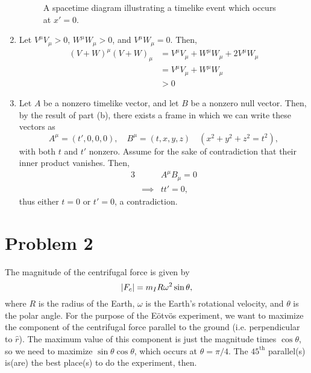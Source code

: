 \documentclass[12pt]{article}
\begin{document}
\begin{enumerate}[label=(\alph*)]
\begin{figure}
{
        }
        \caption{A spacetime diagram illustrating a timelike event which occurs at $x' = 0$.}
        \label{fig1}
    \end{figure}

    \item Let $V^\mu V_\mu > 0$, $W^\mu W_\mu > 0$, and $V^\mu W_\mu = 0$. Then,
    \begin{align*}
        (V+W)^\mu (V+W)_\mu &= V^\mu V_\mu + W^\mu W_\mu + 2V^\mu W_\mu \\
        &= V^\mu V_\mu + W^\mu W_\mu \\
        & > 0
    \end{align*}

    \item Let $A$ be a nonzero timelike vector, and let $B$ be a nonzero null vector. Then, by the result of part (b), there exists a frame in which we can write these vectors as
    \[ A^\mu = (t', 0, 0, 0), \quad B^\mu = (t, x, y, z) \quad (x^2 + y^2 + z^2 = t^2), \] with both $t$ and $t'$ nonzero. Assume for the sake of contradiction that their inner product vanishes. Then,
    \begin{alignat*}{3}
        &          & A^\mu B_\mu = 0 \\
        &\implies  & tt' = 0,
    \end{alignat*}
    thus either $t=0$ or $t'=0$, a contradiction.
\end{enumerate}


\section*{Problem 2}
The magnitude of the centrifugal force is given by
\[ \abs{F_c} = m_I R \omega^2 \sin\theta, \]
where $R$ is the radius of the Earth, $\omega$ is the Earth's rotational velocity, and $\theta$ is the polar angle. For the purpose of the E{\"o}tv{\"o}s experiment, we want to maximize the component of the centrifugal force parallel to the ground (i.e. perpendicular to $\hat{r}$). The maximum value of this component is just the magnitude times $\cos\theta$, so we need to maximize $\sin\theta\cos\theta$, which occurs at $\boxed{\theta = \pi/4}$. The $45^\text{th}$ parallel(s) is(are) the best place(s) to do the experiment, then.
\end{document}
